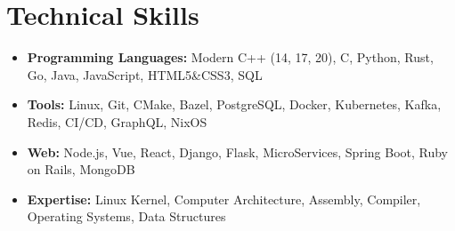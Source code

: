\documentclass[letterpaper,11pt]{article}
\def\vspaceAfterBullets{3.5pt} %
\newcommand{\bulletItem}[1]{
  \item\small{
    {#1}
  }
}
\newcommand{\sectionListStart}{\begin{itemize}[leftmargin=0pt, label={}]}
\newcommand{\sectionListEnd}{\end{itemize}}
\begin{document}

\section{Technical Skills}
\sectionListStart
\bulletItem{\textbf{Programming Languages:}{ Modern C++ (14, 17, 20), C, Python, Rust, Go, Java, JavaScript, HTML5\&CSS3, SQL}}
\vspace{\vspaceAfterBullets}
\bulletItem{\textbf{Tools:}{ Linux, Git, CMake, Bazel, PostgreSQL, Docker, Kubernetes, Kafka, Redis, CI/CD, GraphQL, NixOS}}
\vspace{\vspaceAfterBullets}
\bulletItem{\textbf{Web:}{ Node.js, Vue, React, Django, Flask, MicroServices, Spring Boot, Ruby on Rails, MongoDB }}
\vspace{\vspaceAfterBullets}
\bulletItem{\textbf{Expertise:}{ Linux Kernel, Computer Architecture, Assembly, Compiler, Operating Systems, Data Structures }}
\vspace{\vspaceAfterBullets}
\sectionListEnd


\end{document}
